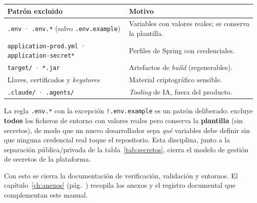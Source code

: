 \vspace{0.2cm}
\noindent
\renewcommand{\arraystretch}{1.3}
\fontsize{8.5}{10.2}\selectfont\sffamily
\begin{tabularx}{\textwidth}{|L{4.2cm}|Y|}
\hline
{}
\sffamily\textbf{Patrón excluido} & \sffamily\textbf{Motivo} \\
\hline
\texttt{.env} · \texttt{.env.*} (salvo \texttt{.env.example}) & Variables con valores reales; se conserva la plantilla. \\ \hline
{}
\texttt{application-prod.yml} · \texttt{application-secret*} & Perfiles de Spring con credenciales. \\ \hline
\texttt{target/} · \texttt{*.jar} & Artefactos de \textit{build} (regenerables). \\ \hline
{}
Llaves, certificados y \textit{keystores} & Material criptográfico sensible. \\ \hline
\texttt{.claude/} · \texttt{.agents/} & \textit{Tooling} de IA, fuera del producto. \\ \hline
\end{tabularx}
\label{tab:gitignore}

\begin{AlertaSeguridad}
La regla \texttt{.env.*} con la excepción \texttt{!.env.example} es un patrón deliberado:
excluye \textbf{todos} los ficheros de entorno con valores reales pero conserva la
\textbf{plantilla} (sin secretos), de modo que un nuevo desarrollador sepa \textit{qué}
variables debe definir sin que ninguna credencial real toque el repositorio. Esta
disciplina, junto a la separación pública/privada de la tabla~\ref{tab:secretos}, cierra el
modelo de gestión de secretos de la plataforma.
\end{AlertaSeguridad}

\bigskip
Con esto se cierra la documentación de verificación, validación y entornos. El
capítulo~\ref{ch:anexos} (pág.~\pageref{ch:anexos}) recopila los anexos y el registro
documental que complementan este manual.
